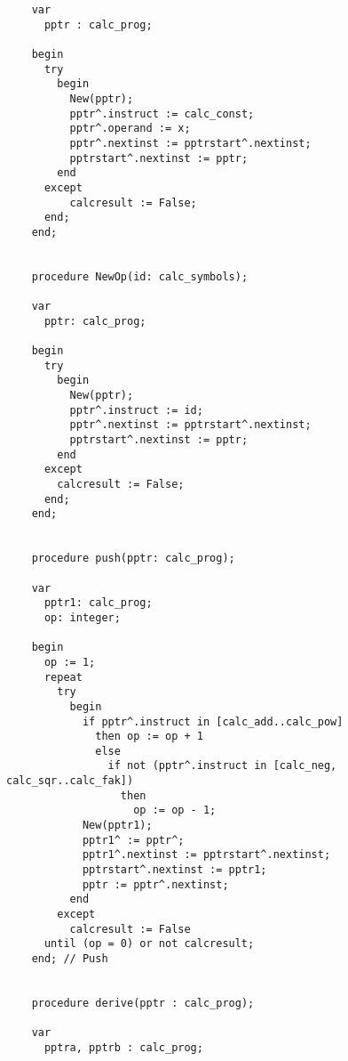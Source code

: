 \begin{refsection}
\begin{lstlisting}
    var
      pptr : calc_prog;

    begin
      try
        begin
          New(pptr);
          pptr^.instruct := calc_const;
          pptr^.operand := x;
          pptr^.nextinst := pptrstart^.nextinst;
          pptrstart^.nextinst := pptr;
        end
      except
          calcresult := False;
      end;
    end;


    procedure NewOp(id: calc_symbols);

    var
      pptr: calc_prog;

    begin
      try
        begin
          New(pptr);
          pptr^.instruct := id;
          pptr^.nextinst := pptrstart^.nextinst;
          pptrstart^.nextinst := pptr;
        end
      except
        calcresult := False;
      end;
    end;


    procedure push(pptr: calc_prog);

    var
      pptr1: calc_prog;
      op: integer;

    begin
      op := 1;
      repeat
        try
          begin
            if pptr^.instruct in [calc_add..calc_pow]
              then op := op + 1
              else
                if not (pptr^.instruct in [calc_neg, calc_sqr..calc_fak])
                  then
                    op := op - 1;
            New(pptr1);
            pptr1^ := pptr^;
            pptr1^.nextinst := pptrstart^.nextinst;
            pptrstart^.nextinst := pptr1;
            pptr := pptr^.nextinst;
          end
        except
          calcresult := False
      until (op = 0) or not calcresult;
    end; // Push


    procedure derive(pptr : calc_prog);

    var
      pptra, pptrb : calc_prog;


\end{lstlisting}
\end{refsection}
